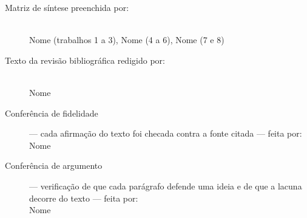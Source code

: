 \documentclass[12pt,a4paper]{article}
\begin{document}
\begin{description}
  \item[Matriz de síntese preenchida por:] \hfill \\
        Nome (trabalhos 1 a 3), Nome (4 a 6), Nome (7 e 8)

  \item[Texto da revisão bibliográfica redigido por:] \hfill \\
        Nome

  \item[Conferência de fidelidade] --- cada afirmação do texto foi checada
        contra a fonte citada --- feita por: \hfill \\
        Nome

  \item[Conferência de argumento] --- verificação de que cada parágrafo defende
        uma ideia e de que a lacuna decorre do texto --- feita por: \hfill \\
        Nome
\end{description}
\end{document}
